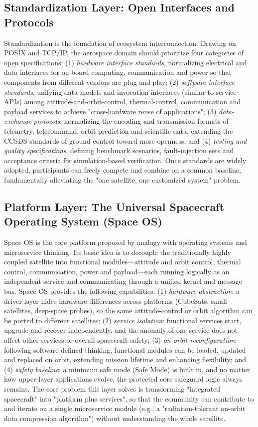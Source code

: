 \documentclass[11pt]{article}
\begin{document}
\subsection{Standardization Layer: Open Interfaces and Protocols}
Standardization is the foundation of ecosystem interconnection. Drawing on POSIX and TCP/IP, the aerospace domain should prioritize four categories of open specifications: (1) \emph{hardware interface standards}, normalizing electrical and data interfaces for on-board computing, communication and power so that components from different vendors are plug-and-play; (2) \emph{software interface standards}, unifying data models and invocation interfaces (similar to service APIs) among attitude-and-orbit-control, thermal-control, communication and payload services to achieve "cross-hardware reuse of applications"; (3) \emph{data-exchange protocols}, normalizing the encoding and transmission formats of telemetry, telecommand, orbit prediction and scientific data, extending the CCSDS standards of ground control toward more openness; and (4) \emph{testing and quality specifications}, defining benchmark scenarios, fault-injection sets and acceptance criteria for simulation-based verification. Once standards are widely adopted, participants can freely compete and combine on a common baseline, fundamentally alleviating the "one satellite, one customized system" problem.

\subsection{Platform Layer: The Universal Spacecraft Operating System (Space OS)}
Space OS is the core platform proposed by analogy with operating systems and microservice thinking. Its basic idea is to decouple the traditionally highly coupled satellite into functional modules---attitude and orbit control, thermal control, communication, power and payload---each running logically as an independent service and communicating through a unified kernel and message bus. Space OS provides the following capabilities: (1) \emph{hardware abstraction}: a driver layer hides hardware differences across platforms (CubeSats, small satellites, deep-space probes), so the same attitude-control or orbit algorithm can be ported to different satellites; (2) \emph{service isolation}: functional services start, upgrade and recover independently, and the anomaly of one service does not affect other services or overall spacecraft safety; (3) \emph{on-orbit reconfiguration}: following software-defined thinking, functional modules can be loaded, updated and replaced on orbit, extending mission lifetime and enhancing flexibility; and (4) \emph{safety baseline}: a minimum safe mode (Safe Mode) is built in, and no matter how upper-layer applications evolve, the protected core safeguard logic always remains. The core problem this layer solves is transforming "integrated spacecraft" into "platform plus services", so that the community can contribute to and iterate on a single microservice module (e.g., a "radiation-tolerant on-orbit data compression algorithm") without understanding the whole satellite.
\end{document}
